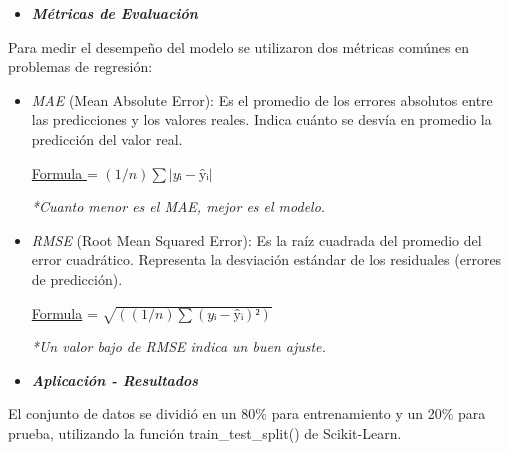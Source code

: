 \documentclass{article}
\begin{document}
\begin{itemize}
    \item \textit{\textbf{Métricas de Evaluación}}
\end{itemize}

Para medir el desempeño del modelo se utilizaron dos métricas comúnes en problemas de regresión:

\begin{itemize}[label=\--]
    \item \textit{MAE} (Mean Absolute Error):  
  Es el promedio de los errores absolutos entre las predicciones y los valores reales.  
  Indica cuánto se desvía en promedio la predicción del valor real.  


    \underline{Formula }= $(1/n) ∑ |yᵢ - ŷᵢ|$
  
  
  \textit{*Cuanto menor es el MAE, mejor es el modelo.}
  
  \item \textit{RMSE} (Root Mean Squared Error):
  Es la raíz cuadrada del promedio del error cuadrático.  
  Representa la desviación estándar de los residuales (errores de predicción).  
  
  
    \underline{Formula} = $\sqrt{((1/n) ∑ (yᵢ - ŷᵢ)²)}$
  
  
  \textit{*Un valor bajo de RMSE indica un buen ajuste.} 
\end{itemize}


\begin{itemize}
    \item \textit{\textbf{Aplicación - Resultados}}
\end{itemize}

El conjunto de datos se dividió en un 80\% para entrenamiento y un 20\% para prueba, utilizando la función train\_test\_split() de Scikit-Learn.
\end{document}
